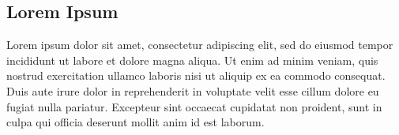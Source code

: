 \documentclass[
  uplatex,
  dvipdfmx,
  a4paper,
  english,
  twocolumn,
  10pt
]{jsarticle}
\begin{document}
\subsection{Lorem Ipsum}
Lorem ipsum dolor sit amet, consectetur adipiscing elit, sed do eiusmod tempor incididunt ut labore et dolore magna aliqua.
Ut enim ad minim veniam, quis nostrud exercitation ullamco laboris nisi ut aliquip ex ea commodo consequat.
Duis aute irure dolor in reprehenderit in voluptate velit esse cillum dolore eu fugiat nulla pariatur.
Excepteur sint occaecat cupidatat non proident, sunt in culpa qui officia deserunt mollit anim id est laborum.
\end{document}
